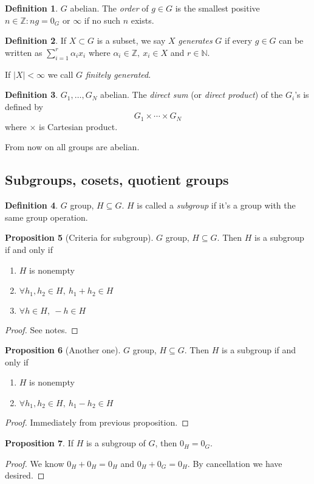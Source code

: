\documentclass[a4paper]{article}
\theoremstyle{definition}
\newtheorem{defn}{Definition}[subsection]
\newtheorem{prop}[defn]{Proposition}
\begin{document}
\begin{defn}
$G$ abelian. The \textit{order} of $g\in G$ is the smallest positive $n\in \mathbb Z : ng = 0_G$ or $\infty$ if no such $n$ exists.
\end{defn}
\begin{defn}
If $X\subset G$ is a subset, we say $X$ \textit{generates} $G$ if every $g\in G$ can be written as $\sum_{i=1}^r \alpha _i x_i$ where $\alpha_i\in \mathbb Z,\ x_i\in X$ and $r\in \mathbb N.$

If $|X|<\infty$ we call $G$ \textit{finitely generated}.
\end{defn}
\begin{defn}
$G_1,\ldots,G_N$ abelian. The \textit{direct sum} (or \textit{direct product}) of the $G_i$'s is defined by
\[
G_1 \times \cdots \times G_N
\]
where $\times$ is Cartesian product.
\end{defn}

From now on all groups are abelian.
\subsection{Subgroups, cosets, quotient groups}
\begin{defn}
$G$ group, $H\subseteq G$. $H$ is called a \textit{subgroup} if it's a group with the same group operation.
\end{defn}
\begin{prop}[Criteria for subgroup]
$G$ group, $H\subseteq G$. Then $H$ is a subgroup if and only if
\begin{enumerate}
    \item $H$ is nonempty
    \item $\forall h_1,h_2 \in H,\ h_1+h_2\in H$
    \item $\forall h\in H,\ -h\in H$
\end{enumerate}
\end{prop}
\begin{proof}
See notes.
\end{proof}
\begin{prop}[Another one]
$G$ group, $H\subseteq G$. Then $H$ is a subgroup if and only if
\begin{enumerate}
    \item $H$ is nonempty
    \item $\forall h_1,h_2\in H,\ h_1-h_2 \in H$
\end{enumerate}
\end{prop}
\begin{proof}
Immediately from previous proposition.
\end{proof}
\begin{prop}
If $H$ is a subgroup of $G$, then $0_H=0_G$.
\end{prop}
\begin{proof}
We know $0_H+0_H=0_H$ and $0_H+0_G=0_H$. By cancellation we have desired.
\end{proof}
\end{document}
